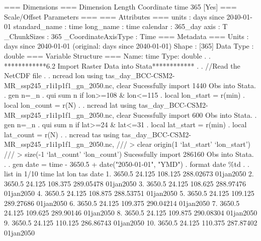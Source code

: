 {\smallskip}
=== Dimensions ===
Dimension       Length   Coordinate     
time            365      [Yes]          
{\smallskip}
=== Scale/Offset Parameters ===
{\smallskip}
=== Attributes ===
units               : days since 2040-01-01
standard_name       : time
long_name           : time
calendar            : 365_day
axis                : T
_ChunkSizes         : 365
_CoordinateAxisType : Time
{\smallskip}
=== Metadata ===
Units          : days since 2040-01-01 (original: days since 2040-01-01)
{\smallskip}
Shape          : [365]
Data Type      : double
{\smallskip}
=== Variable Structure ===
Name: time                      Type: double         
{\smallskip}
. 
. ************6.2 Import Raster Data into Stata************
. 
. //Read the NetCDF file
. 
. ncread lon using tas_day_BCC-CSM2-MR_ssp245_r1i1p1f1_gn_2050.nc, clear 
Sucessfully import 1440 Obs into Stata.
{\smallskip}
. gen n=_n 
{\smallskip}
. qui sum n if lon>=108 \& lon<=115
{\smallskip}
. local lon_start = r(min)
{\smallskip}
. local lon_count = r(N)
{\smallskip}
. 
. ncread lat using tas_day_BCC-CSM2-MR_ssp245_r1i1p1f1_gn_2050.nc, clear 
Sucessfully import 600 Obs into Stata.
{\smallskip}
. gen n=_n 
{\smallskip}
. qui sum n if lat>=24 \& lat<=31
{\smallskip}
. local lat_start = r(min)
{\smallskip}
. local lat_count = r(N)
{\smallskip}
. 
. ncread tas using tas_day_BCC-CSM2-MR_ssp245_r1i1p1f1_gn_2050.nc, ///
>                         clear origin(1 `lat_start' `lon_start') ///
>                         size(-1 `lat_count' `lon_count')
{\smallskip}
{\smallskip}
Sucessfully import 286160 Obs into Stata.
{\smallskip}
. 
. gen date = time - 3650.5  + date("2050-01-01", "YMD")
{\smallskip}
. format date \%td
{\smallskip}
. 
. list in 1/10
{\smallskip}
     {\TLC}
     {\VBAR}   time      lat       lon         tas        date {\VBAR}
     {\LFTT}
  1. {\VBAR} 3650.5   24.125   108.125   288.02673   01jan2050 {\VBAR}
  2. {\VBAR} 3650.5   24.125   108.375   289.05478   01jan2050 {\VBAR}
  3. {\VBAR} 3650.5   24.125   108.625   288.97476   01jan2050 {\VBAR}
  4. {\VBAR} 3650.5   24.125   108.875   288.53751   01jan2050 {\VBAR}
  5. {\VBAR} 3650.5   24.125   109.125   289.27686   01jan2050 {\VBAR}
     {\LFTT}
  6. {\VBAR} 3650.5   24.125   109.375   290.04214   01jan2050 {\VBAR}
  7. {\VBAR} 3650.5   24.125   109.625   289.90146   01jan2050 {\VBAR}
  8. {\VBAR} 3650.5   24.125   109.875   290.08304   01jan2050 {\VBAR}
  9. {\VBAR} 3650.5   24.125   110.125   286.86743   01jan2050 {\VBAR}
 10. {\VBAR} 3650.5   24.125   110.375   287.87402   01jan2050 {\VBAR}

